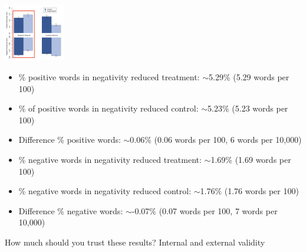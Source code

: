 \documentclass[aspectratio=169]{beamer}
\begin{document}
\begin{frame}

\begin{center}
\includegraphics[width=0.2\textwidth]{figures/kramer_experimental_2014_fig1_negativity_reduced}
\end{center}

\begin{itemize}
\item \% positive words in negativity reduced treatment: $\sim$5.29\% (5.29 words per 100)
\item \% of positive words in negativity reduced control: $\sim$5.23\% (5.23 words per 100)
\item Difference \% positive words: $\sim$0.06\% (0.06 words per 100, 6 words per 10,000) 
\end{itemize}

\pause

\begin{itemize}
\item \% negative words in negativity reduced treatment: $\sim$1.69\% (1.69 words per 100)
\item \% negative words in negativity reduced control: $\sim$1.76\% (1.76 words per 100)
\item Difference \% negative words: $\sim$-0.07\% (0.07 words per 100, 7 words per 10,000) 
\end{itemize}


\end{frame}
\begin{frame}

How much should you trust these results? Internal and external validity

\end{frame}
\end{document}
